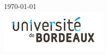 \documentclass[12pt]{report}
\begin{document}
\begin{titlepage}
{\large \today}\\[1.5cm] %


\includegraphics[height=80px]{Assets/logoUniversite.jpg}\\[1cm] %
 

\vfill 

\end{titlepage}

\tableofcontents

\newpage












\nocite{*}
\end{document}
